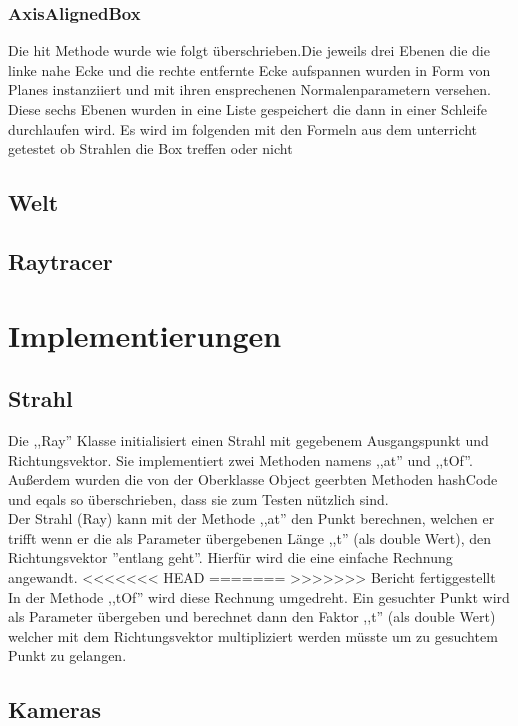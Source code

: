 \documentclass[14pt]{extarticle}
\begin{document}
\subsubsection{AxisAlignedBox}
Die hit Methode wurde wie folgt überschrieben.Die jeweils drei Ebenen die die linke nahe Ecke und die rechte entfernte Ecke aufspannen wurden in Form von Planes instanziiert und mit ihren ensprechenen Normalenparametern versehen. Diese sechs Ebenen wurden in eine Liste gespeichert die dann in einer Schleife durchlaufen wird. Es wird im folgenden mit den Formeln aus dem unterricht getestet ob Strahlen die Box treffen oder nicht

\subsection{Welt}
\subsection{Raytracer}
\section{Implementierungen}

\subsection{Strahl}
Die ,,Ray'' Klasse initialisiert einen Strahl mit gegebenem Ausgangspunkt und Richtungsvektor. Sie implementiert zwei Methoden namens ,,at'' und ,,tOf''. Außerdem wurden die von der Oberklasse Object geerbten Methoden hashCode und eqals so überschrieben, dass sie zum Testen nützlich sind.\\
Der Strahl (Ray) kann mit der Methode ,,at'' den Punkt berechnen, welchen er trifft wenn er die als Parameter übergebenen Länge ,,t'' (als double Wert), den Richtungsvektor ''entlang geht''. Hierfür wird die eine einfache Rechnung angewandt. 
<<<<<<< HEAD
=======
>>>>>>> Bericht fertiggestellt
In der Methode ,,tOf'' wird diese Rechnung umgedreht. Ein gesuchter Punkt wird als Parameter übergeben und berechnet dann den Faktor ,,t'' (als double Wert) welcher mit dem Richtungsvektor multipliziert werden müsste um zu gesuchtem Punkt zu gelangen. \\
\subsection{Kameras}
\end{document}
